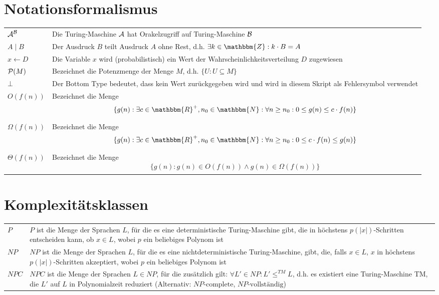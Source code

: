 \section{Notationsformalismus}
\begin{tabularx}{\textwidth}{ p{} | X }
	$\mathcal{A}^{\mathcal{B}}$ & Die Turing-Maschine $\mathcal{A}$ hat Orakelzugriff auf Turing-Maschine $\mathcal{B}$\\
	$A \mid B$ & Der Ausdruck $B$ teilt Ausdruck $A$ ohne Rest, d.h. $\exists k \in \mathbbm{Z} : k \cdot B = A$\\
	$x \leftarrow D$ & Die Variable $x$ wird (probabilistisch) ein Wert der Wahrscheinlichkeitsverteilung $D$ zugewiesen\\
	$\mathcal{P}(M)$ & Bezeichnet die Potenzmenge der Menge $M$, d.h. $\{U : U \subseteq M\}$\\
	$\bot$ & Der Bottom Type bedeutet, dass kein Wert zurückgegeben wird und wird in diesem Skript als Fehlersymbol verwendet\\
	$O(f(n))$ & Bezeichnet die Menge
	\begin{align*}
		\{g(n) : \exists c \in \mathbbm{R}^{+}, n_0 \in \mathbbm{N} : \forall n \geq n_0 : 0 \leq g(n) \leq c \cdot f(n)\}
	\end{align*}\\
	$\Omega(f(n))$ & Bezeichnet die Menge
	\begin{align*}
		\{g(n) : \exists c \in \mathbbm{R}^{+}, n_0 \in \mathbbm{N} : \forall n \geq n_0 : 0 \leq c \cdot f(n) \leq g(n)\}
	\end{align*}\\
	$\Theta(f(n))$ & Bezeichnet die Menge
	\begin{align*}
		\{g(n) : g(n) \in O(f(n)) \land g(n) \in \Omega(f(n))\}
	\end{align*}\\
\end{tabularx}

\section{Komplexitätsklassen}
\begin{tabularx}{\textwidth}{ p{} | X }
	$P$ & $P$ ist die Menge der Sprachen $L$, für die es eine deterministische Turing-Maschine gibt, die in höchstens $p(\vert x \vert)$-Schritten entscheiden kann,
	ob ${x \in L}$, wobei $p$ ein beliebiges Polynom ist\\
	$NP$ & $NP$ ist die Menge der Sprachen $L$, für die es eine nichtdeterministische Turing-Maschine, gibt, die, falls ${x \in L}$, $x$ in höchstens
	$p(\vert x \vert)$-Schritten akzeptiert, wobei $p$ ein beliebiges Polynom ist\\
	$NPC$ & $NPC$ ist die Menge der Sprachen $L \in NP$, für die zusätzlich gilt: ${\forall L' \in NP : L' \leq^{TM} L}$, d.h. es existiert eine Turing-Maschine TM,
	die $L'$ auf $L$ in Polynomialzeit reduziert (Alternativ: $NP\text{-complete}$, $NP\text{-vollständig}$)\\
\end{tabularx}


